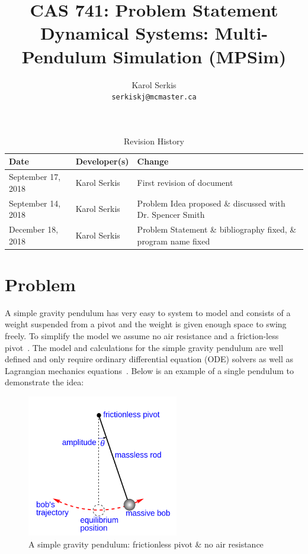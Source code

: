 \documentclass{article}
\title{CAS 741: Problem Statement\\[10pt]\Large Dynamical Systems: 
Multi-Pendulum Simulation (MPSim)}
\author{Karol Serkis\\\texttt{serkiskj@mcmaster.ca}}
\date{}
\begin{document}

\maketitle

\begin{table}[hp]
\caption{Revision History} \label{TblRevisionHistory}
\begin{tabularx}{\textwidth}{llX}
\toprule
\textbf{Date} & \textbf{Developer(s)} & \textbf{Change}\\
\midrule
September 17, 2018 & Karol Serkis & First revision of document\\
September 14, 2018 & Karol Serkis & Problem Idea proposed \& discussed with Dr.
Spencer Smith \\
December 18, 2018 & Karol Serkis & Problem Statement \& bibliography fixed, 
\& program name fixed \\
\bottomrule
\end{tabularx}
\end{table}

\section*{Problem}

A simple gravity pendulum has very easy to system to model and consists of a
weight suspended from a pivot and the weight is given enough space to swing
freely. To simplify the model we assume no air resistance and a friction-less
pivot~\cite{WikiPendulum}. The model and calculations for the simple gravity 
pendulum are well defined and only require ordinary differential equation (ODE) 
solvers as well as Lagrangian mechanics equations~\cite{MathPendulum}. Below
is an example of a single pendulum to demonstrate the idea:
\begin{figure}[H]
	\centering
	\includegraphics[width=250px]{simple-pend.png}
\caption{A simple gravity pendulum: frictionless pivot \& no air 
resistance~\cite{WikiPendulum}}
	\label{fig:simplepend}
\end{figure}
\end{document}
